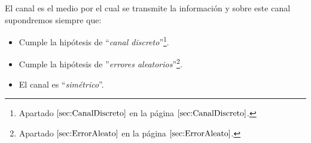 El canal es el medio por el cual se transmite la informaci\'on y sobre este
canal supondremos siempre que:
\begin{itemize}
\item Cumple la hip\'otesis de ``\emph{canal discreto}''\footnote{Apartado
$\ref{sec:CanalDiscreto}$ en la p\'agina $\pageref{sec:CanalDiscreto}$.}. 
\item Cumple la hip\'otesis de ''\emph{errores aleatorios}''\footnote{Apartado
$\ref{sec:ErrorAleato}$ en la p\'agina $\pageref{sec:ErrorAleato}$.}.
\item El canal es ``\emph{sim\'etrico}''.
\end{itemize}

%
%


